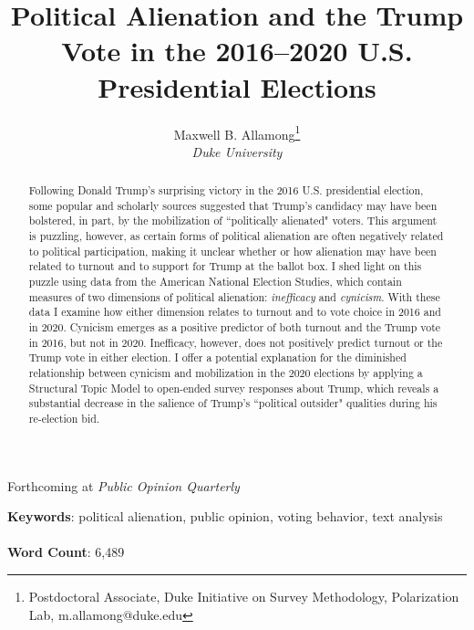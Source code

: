 \documentclass[12pt]{article}
\title{Political Alienation and the Trump Vote in the 2016--2020 U.S. Presidential Elections}
\author{}
\author{Maxwell B. Allamong\thanks{Postdoctoral Associate, Duke Initiative on Survey Methodology, Polarization Lab, m.allamong@duke.edu} \\ \vspace{-1em} \textit{Duke University}}
\date{}
\begin{document}
\maketitle
\thispagestyle{empty}


\vspace{-1.5cm}
\begin{center}
    Forthcoming at \textit{Public Opinion Quarterly}
\end{center}
\begin{abstract}  
 Following Donald Trump's surprising victory in the 2016 U.S. presidential election, some popular and scholarly sources suggested that Trump's candidacy may have been bolstered, in part, by the mobilization of ``politically alienated" voters. This argument is puzzling, however, as certain forms of political alienation are often negatively related to political participation, making it unclear whether or how alienation may have been related to turnout and to support for Trump at the ballot box. I shed light on this puzzle using data from the American National Election Studies, which contain measures of two dimensions of political alienation: \textit{inefficacy} and \textit{cynicism}. With these data I examine how either dimension relates to turnout and to vote choice in 2016 and in 2020. Cynicism emerges as a positive predictor of both turnout and the Trump vote in 2016, but not in 2020. Inefficacy, however, does not positively predict turnout or the Trump vote in either election. I offer a potential explanation for the diminished relationship between cynicism and mobilization in the 2020 elections by applying a Structural Topic Model to open-ended survey responses about Trump, which reveals a substantial decrease in the salience of Trump's ``political outsider" qualities during his re-election bid. 
\end{abstract}
\vspace{1.5cm}
\textbf{Keywords}: political alienation, public opinion, voting behavior, text analysis \\ \\
\textbf{Word Count}: 6,489 \\


\clearpage
{}



\doublespacing
\end{document}
